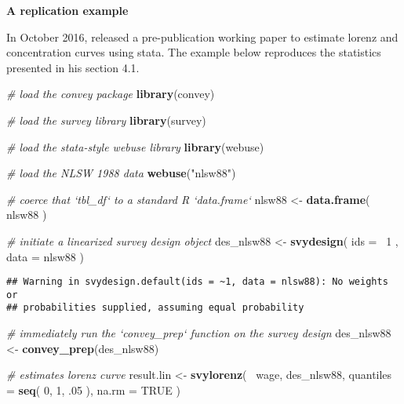 \documentclass[]{book}
\newenvironment{Shaded}{\begin{snugshade}}{\end{snugshade}}
\newcommand{\KeywordTok}[1]{\textcolor[rgb]{0.13,0.29,0.53}{\textbf{{#1}}}}
\newcommand{\DataTypeTok}[1]{\textcolor[rgb]{0.13,0.29,0.53}{{#1}}}
\newcommand{\DecValTok}[1]{\textcolor[rgb]{0.00,0.00,0.81}{{#1}}}
\newcommand{\StringTok}[1]{\textcolor[rgb]{0.31,0.60,0.02}{{#1}}}
\newcommand{\CommentTok}[1]{\textcolor[rgb]{0.56,0.35,0.01}{\textit{{#1}}}}
\newcommand{\OtherTok}[1]{\textcolor[rgb]{0.56,0.35,0.01}{{#1}}}
\newcommand{\NormalTok}[1]{{#1}}
\theoremstyle{definition}
\theoremstyle{definition}
\theoremstyle{remark}
\begin{document}
\textbf{A replication example}

In October 2016, \citep{jann2016} released a pre-publication working
paper to estimate lorenz and concentration curves using stata. The
example below reproduces the statistics presented in his section 4.1.

\begin{Shaded}
\begin{Highlighting}[]
\CommentTok{# load the convey package}
\KeywordTok{library}\NormalTok{(convey)}

\CommentTok{# load the survey library}
\KeywordTok{library}\NormalTok{(survey)}

\CommentTok{# load the stata-style webuse library}
\KeywordTok{library}\NormalTok{(webuse)}

\CommentTok{# load the NLSW 1988 data}
\KeywordTok{webuse}\NormalTok{(}\StringTok{"nlsw88"}\NormalTok{)}

\CommentTok{# coerce that `tbl_df` to a standard R `data.frame`}
\NormalTok{nlsw88 <-}\StringTok{ }\KeywordTok{data.frame}\NormalTok{( nlsw88 )}

\CommentTok{# initiate a linearized survey design object}
\NormalTok{des_nlsw88 <-}\StringTok{ }\KeywordTok{svydesign}\NormalTok{( }\DataTypeTok{ids =} \NormalTok{~}\DecValTok{1} \NormalTok{, }\DataTypeTok{data =} \NormalTok{nlsw88 )}
\end{Highlighting}
\end{Shaded}

\begin{verbatim}
## Warning in svydesign.default(ids = ~1, data = nlsw88): No weights or
## probabilities supplied, assuming equal probability
\end{verbatim}

\begin{Shaded}
\begin{Highlighting}[]
\CommentTok{# immediately run the `convey_prep` function on the survey design}
\NormalTok{des_nlsw88 <-}\StringTok{ }\KeywordTok{convey_prep}\NormalTok{(des_nlsw88)}

\CommentTok{# estimates lorenz curve}
\NormalTok{result.lin <-}\StringTok{ }\KeywordTok{svylorenz}\NormalTok{( ~wage, des_nlsw88, }\DataTypeTok{quantiles =} \KeywordTok{seq}\NormalTok{( }\DecValTok{0}\NormalTok{, }\DecValTok{1}\NormalTok{, .}\DecValTok{05} \NormalTok{), }\DataTypeTok{na.rm =} \OtherTok{TRUE} \NormalTok{)}
\end{Highlighting}
\end{Shaded}
\end{document}
